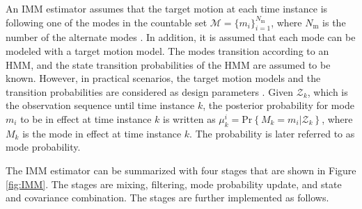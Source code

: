 \documentclass[english, 12pt, a4paper, elec, utf8, a-1b, online]{aaltothesis}
\numberwithin{equation}{section}
\renewcommand{\Pr}[1]{\text{Pr}\left\{ #1 \right\}}
\newcommand{\modeprob}{\mu_k^i}
\newcommand{\nmodels}{{N_\text{m}}}
\begin{document}
An IMM estimator assumes that the target motion at each time instance is following one of the modes in the countable set $\mathcal{M} = \{ m_i \}_{i=1}^\nmodels$, where $\nmodels$ is the number of the alternate modes \cite{BarShalom2001}.
In addition, it is assumed that each mode can be modeled with a target motion model.
The modes transition according to an HMM, and the state transition probabilities of the HMM are assumed to be known.
However, in practical scenarios, the target motion models and the transition probabilities are considered as design parameters \cite{Simeonova2002}.
Given $\mathcal{Z}_k$, which is the observation sequence until time instance $k$, the posterior probability for mode $m_i$ to be in effect at time instance $k$ is written as $\modeprob = \Pr{M_k=m_i | \mathcal{Z}_k}$, where $M_k$ is the mode in effect at time instance $k$.
The probability is later referred to as mode probability.

The IMM estimator can be summarized with four stages that are shown in Figure \ref{fig:IMM}.
The stages are mixing, filtering, mode probability update, and state and covariance combination. 
The stages are further implemented as follows.
\end{document}
